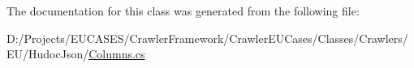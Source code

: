 The documentation for this class was generated from the following file\-:\begin{DoxyCompactItemize}
\item 
D\-:/\-Projects/\-E\-U\-C\-A\-S\-E\-S/\-Crawler\-Framework/\-Crawler\-E\-U\-Cases/\-Classes/\-Crawlers/\-E\-U/\-Hudoc\-Json/\hyperlink{_columns_8cs}{Columns.\-cs}\end{DoxyCompactItemize}
